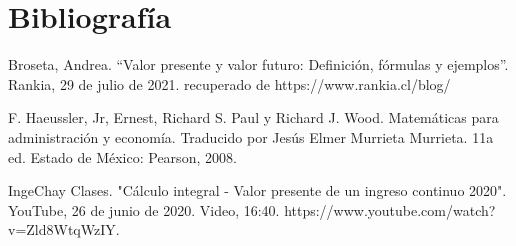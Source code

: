 \documentclass{article}
\begin{document}
        \section{Bibliografía}
            
            Broseta, Andrea.  ``Valor presente y valor futuro: Definición, fórmulas y ejemplos''. Rankia, 29 de julio de 2021. recuperado de https://www.rankia.cl/blog/

            F. Haeussler, Jr, Ernest, Richard S. Paul y Richard J. Wood. Matemáticas para administración y economía. Traducido por Jesús Elmer Murrieta Murrieta. 11a ed. Estado de México: Pearson, 2008.

            IngeChay Clases. "Cálculo integral - Valor presente de un ingreso continuo 2020". YouTube, 26 de junio de 2020. Video, 16:40. https://www.youtube.com/watch?v=Zld8WtqWzIY.
\end{document}
